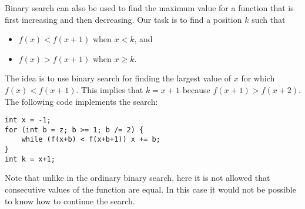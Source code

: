 Binary search can also be used to find
the maximum value for a function that is
first increasing and then decreasing.
Our task is to find a position $k$ such that

\begin{itemize}
\item
$f(x)<f(x+1)$ when $x<k$, and
\item
$f(x)>f(x+1)$ when $x \ge k$.
\end{itemize}

The idea is to use binary search
for finding the largest value of $x$
for which $f(x)<f(x+1)$.
This implies that $k=x+1$
because $f(x+1)>f(x+2)$.
The following code implements the search: 

\begin{lstlisting}
int x = -1;
for (int b = z; b >= 1; b /= 2) {
    while (f(x+b) < f(x+b+1)) x += b;
}
int k = x+1;
\end{lstlisting}

Note that unlike in the ordinary binary search,
here it is not allowed that consecutive values
of the function are equal.
In this case it would not be possible to know
how to continue the search.
